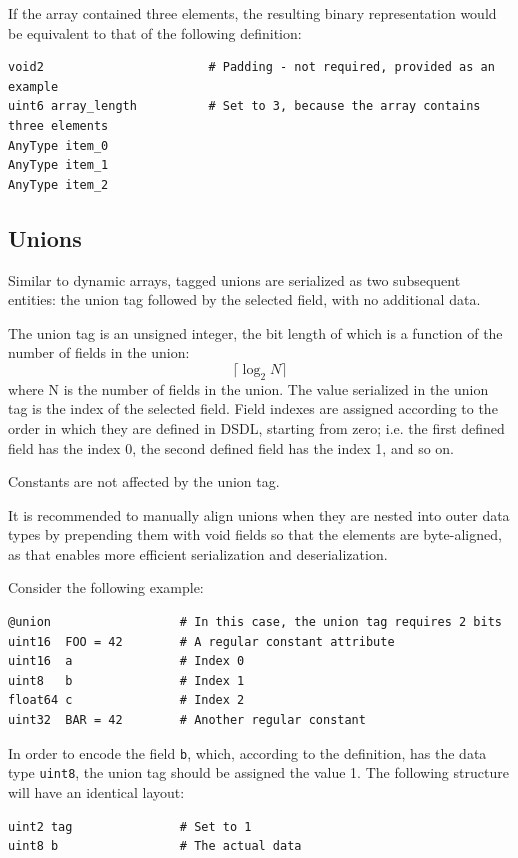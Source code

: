 If the array contained three elements,
the resulting binary representation would be equivalent to that of the following definition:

\begin{verbatim}
void2                       # Padding - not required, provided as an example
uint6 array_length          # Set to 3, because the array contains three elements
AnyType item_0
AnyType item_1
AnyType item_2
\end{verbatim}

\subsection{Unions}

Similar to dynamic arrays, tagged unions are serialized as two subsequent entities:
the union tag followed by the selected field, with no additional data.

The union tag is an unsigned integer, the bit length of which is a function of the number of fields in the union:
$$\lceil{}\log_2 N\rceil{}$$
where N is the number of fields in the union.
The value serialized in the union tag is the index of the selected field.
Field indexes are assigned according to the order in which they are defined in DSDL,
starting from zero;
i.e. the first defined field has the index 0, the second defined field has the index 1, and so on.

Constants are not affected by the union tag.

It is recommended to manually align unions when they are nested into outer data types by
prepending them with void fields so that the elements are byte-aligned,
as that enables more efficient serialization and deserialization.

Consider the following example:

\begin{verbatim}
@union                  # In this case, the union tag requires 2 bits
uint16  FOO = 42        # A regular constant attribute
uint16  a               # Index 0
uint8   b               # Index 1
float64 c               # Index 2
uint32  BAR = 42        # Another regular constant
\end{verbatim}

In order to encode the field \verb|b|, which, according to the definition,
has the data type \verb|uint8|, the union tag should be assigned the value 1.
The following structure will have an identical layout:

\begin{verbatim}
uint2 tag               # Set to 1
uint8 b                 # The actual data
\end{verbatim}

